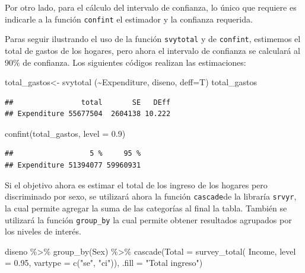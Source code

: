 \documentclass[
  12pt,
]{book}
\newenvironment{Shaded}{\begin{snugshade}}{\end{snugshade}}
\newcommand{\AttributeTok}[1]{\textcolor[rgb]{0.77,0.63,0.00}{#1}}
\newcommand{\FloatTok}[1]{\textcolor[rgb]{0.00,0.00,0.81}{#1}}
\newcommand{\FunctionTok}[1]{\textcolor[rgb]{0.00,0.00,0.00}{#1}}
\newcommand{\NormalTok}[1]{#1}
\newcommand{\OtherTok}[1]{\textcolor[rgb]{0.56,0.35,0.01}{#1}}
\newcommand{\SpecialCharTok}[1]{\textcolor[rgb]{0.00,0.00,0.00}{#1}}
\newcommand{\StringTok}[1]{\textcolor[rgb]{0.31,0.60,0.02}{#1}}
\begin{document}
Por otro lado, para el cálculo del intervalo de confianza, lo único que requiere es indicarle a la función \texttt{confint} el estimador y la confianza requerida.

Paras seguir ilustrando el uso de la función \texttt{svytotal} y de \texttt{confint}, estimemos el total de gastos de los hogares, pero ahora el intervalo de confianza se calculará al 90\% de confianza. Los siguientes códigos realizan las estimaciones:

\begin{Shaded}
\begin{Highlighting}[]
\NormalTok{total\_gastos}\OtherTok{\textless{}{-}} \FunctionTok{svytotal}\NormalTok{ (}\SpecialCharTok{\textasciitilde{}}\NormalTok{Expenditure, diseno, }\AttributeTok{deff=}\NormalTok{T) }
\NormalTok{total\_gastos}
\end{Highlighting}
\end{Shaded}

\begin{verbatim}
##                total       SE   DEff
## Expenditure 55677504  2604138 10.222
\end{verbatim}

\begin{Shaded}
\begin{Highlighting}[]
\FunctionTok{confint}\NormalTok{(total\_gastos, }\AttributeTok{level =} \FloatTok{0.9}\NormalTok{)}
\end{Highlighting}
\end{Shaded}

\begin{verbatim}
##                  5 %     95 %
## Expenditure 51394077 59960931
\end{verbatim}

Si el objetivo ahora es estimar el total de los ingreso de los hogares pero discriminado por sexo, se utilizará ahora la función \texttt{cascade}de la libraría \texttt{srvyr}, la cual permite agregar
la suma de las categorías al final la tabla. También se utilizará la función \texttt{group\_by} la cual permite obtener resultados agrupados por los niveles de interés.

\begin{Shaded}
\begin{Highlighting}[]
\NormalTok{diseno }\SpecialCharTok{\%\textgreater{}\%} \FunctionTok{group\_by}\NormalTok{(Sex) }\SpecialCharTok{\%\textgreater{}\%}
  \FunctionTok{cascade}\NormalTok{(}\AttributeTok{Total =} \FunctionTok{survey\_total}\NormalTok{(}
\NormalTok{    Income, }\AttributeTok{level =} \FloatTok{0.95}\NormalTok{,}
    \AttributeTok{vartype =}  \FunctionTok{c}\NormalTok{(}\StringTok{"se"}\NormalTok{, }\StringTok{"ci"}\NormalTok{)),}
          \AttributeTok{.fill =} \StringTok{"Total ingreso"}\NormalTok{)}
\end{Highlighting}
\end{Shaded}
\end{document}

